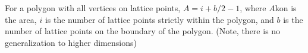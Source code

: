 For a polygon with all vertices on lattice points, $A = i + b/2 - 1$, where $A$kon
is the area, $i$ is the number of lattice points strictly within the polygon,
and $b$ is the number of lattice points on the boundary of the polygon. (Note,
there is no generalization to higher dimensions)